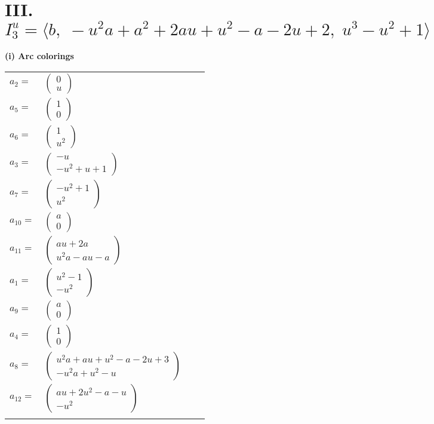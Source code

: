 \documentclass[1p]{elsarticle_modified}
\theoremstyle{definition}
\begin{document}
\centering \section*{III. $I^u_{3}= \langle b,\;- u^2 a+a^2+2 a u+u^2- a-2 u+2,\;u^3- u^2+1 \rangle$}
\flushleft \textbf{(i) Arc colorings}\\
\begin{tabular}{m{7pt} m{180pt} m{7pt} m{180pt} }
\flushright $a_{2}=$&$\begin{pmatrix}0\\u\end{pmatrix}$ \\
\flushright $a_{5}=$&$\begin{pmatrix}1\\0\end{pmatrix}$ \\
\flushright $a_{6}=$&$\begin{pmatrix}1\\u^2\end{pmatrix}$ \\
\flushright $a_{3}=$&$\begin{pmatrix}- u\\- u^2+u+1\end{pmatrix}$ \\
\flushright $a_{7}=$&$\begin{pmatrix}- u^2+1\\u^2\end{pmatrix}$ \\
\flushright $a_{10}=$&$\begin{pmatrix}a\\0\end{pmatrix}$ \\
\flushright $a_{11}=$&$\begin{pmatrix}a u+2 a\\u^2 a- a u- a\end{pmatrix}$ \\
\flushright $a_{1}=$&$\begin{pmatrix}u^2-1\\- u^2\end{pmatrix}$ \\
\flushright $a_{9}=$&$\begin{pmatrix}a\\0\end{pmatrix}$ \\
\flushright $a_{4}=$&$\begin{pmatrix}1\\0\end{pmatrix}$ \\
\flushright $a_{8}=$&$\begin{pmatrix}u^2 a+a u+u^2- a-2 u+3\\- u^2 a+u^2- u\end{pmatrix}$ \\
\flushright $a_{12}=$&$\begin{pmatrix}a u+2 u^2- a- u\\- u^2\end{pmatrix}$\\&\end{tabular}
\end{document}
